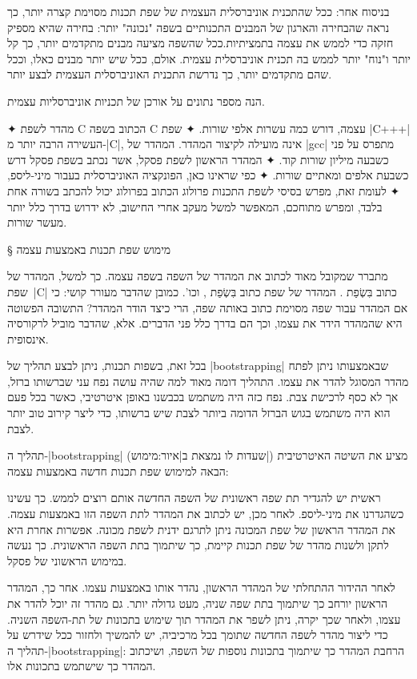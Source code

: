 בניסוח אחר: ככל שהתכנית אוניברסלית העצמית של שפת תכנות מסוימת קצרה יותר, כך
נראה שהבחירה והארגון של המבנים התכנותיים בשפה "נכונה" יותר: בחירה שהיא מספיק
חזקה כדי לממש את עצמה בתמציתיות.ככל שהשפה מציעה מבנים מתקדמים יותר, כך קל יותר
ו"נוח" יותר לממש בה תכנית אוניברסלית עצמית. אולם, ככל שיש יותר מבנים כאלו, וככל
שהם מתקדמים יותר, כך נדרשת התכנית האוניברסלית העצמית לבצע יותר.

הנה מספר נתונים על אורכן של תכניות אוניברסליות עצמית.
\begin{enumerate}
    ✦ מהדר לשפת C הכתוב בשפה C עצמה, דורש כמה עשרות אלפי שורות.
    ✦ שפת \E|C+++| העשירה הרבה יותר מ-\E|C|, אינה מועילה לקיצור המהדר. המהדר
    של \E|gcc| מתפרס על פני כשבעה מיליון שורות קוד.
    ✦ המהדר הראשון לשפת פסקל, אשר נכתב בשפת פסקל דרש כשבעת אלפים ומאתיים שורות.
    ✦ כפי שראינו כאן, הפונקציה האוניברסלית  בעבור מיני-ליספ,
    ✦ לעומת זאת, מפרש בסיסי לשפת התכנות פרולוג הכתוב בפרולוג יכול להכתב בשורה
    אחת בלבד, ומפרש מתוחכם, המאפשר למשל מעקב אחרי החישוב, לא ידרוש בדרך כלל
    יותר מעשר שורות.
\end{enumerate}

§ מימוש שפת תכנות באמצעות עצמה

מתברר שמקובל מאוד לכתוב את המהדר של השפה בשפה עצמה. כך למשל, המהדר של שפת~\E|C|
כתוב בִּשְׂפַת . המהדר של שפת  כתוב בִּשְׂפַת , וכו'. כמובן שהדבר מעורר
קושי: כי אם המהדר עבור שפה מסוימת כתוב באותה שפה, הרי כיצד הודר המהדר? התשובה
הפשוטה היא שהמהדר הידר את עצמו, וכך הם בדרך כלל פני הדברים. אלא, שהדבר מוביל
לרקורסיה אינסופית.

בכל זאת, בשפות תכנות, ניתן לבצע תהליך של \E|bootstrapping| שבאמצעותו ניתן לפתח
מהדר המסוגל להדר את עצמו. התהליך דומה מאוד למה שהיה עושה נפח עני שברשותו ברזל,
אך לא כסף לרכישת צבת. נפח כזה היה משתמש בכבשנו באופן איטרטיבי, כאשר בכל פעם הוא
היה משתמש בגוש הברזל הדומה ביותר לצבת שיש ברשותו, כדי ליצר קירוב טוב יותר לצבת.

תהליך ה-\E|bootstrapping| (שעדות לו נמצאת ב|איור:מימוש|) מציע את השיטה
האיטרטיבית הבאה למימוש שפת תכנות חדשה באמצעות עצמה:

ראשית יש להגדיר תת שפה ראשונית של השפה החדשה אותם רוצים לממש. כך עשינו כשהגדרנו
את מיני-ליספ. לאחר מכן, יש לכתוב את המהדר לתת השפה הזו באמצעות עצמה. את המהדר
הראשון של שפת המכונה ניתן לתרגם ידנית לשפת מכונה. אפשרות אחרת היא לתקן ולשנות מהדר
של שפת תכנות קיימת, כך שיתמוך בתת השפה הראשונית. כך נעשה במימוש הראשוני של פסקל.

לאחר ההידור ההתחלתי של המהדר הראשון, נהדר אותו באמצעות עצמו. אחר כך, המהדר
הראשון יורחב כך שיתמוך בתת שפה שניה, מעט גדולה יותר. גם מהדר זה יוכל להדר את
עצמו, ולאחר שכך יקרה, ניתן לשפר את המהדר תוך שימוש בתכונות של תת-השפה השניה.
כדי ליצור מהדר לשפה החדשה שתומך בכל מרכיביה, יש להמשיך ולחזור ככל שידרש על
תהליך ה-\E|bootstrapping|: הרחבת המהדר כך שיתמוך בתכונות נוספות של השפה,
ושיכתוב המהדר כך שישתמש בתכונות אלו.

